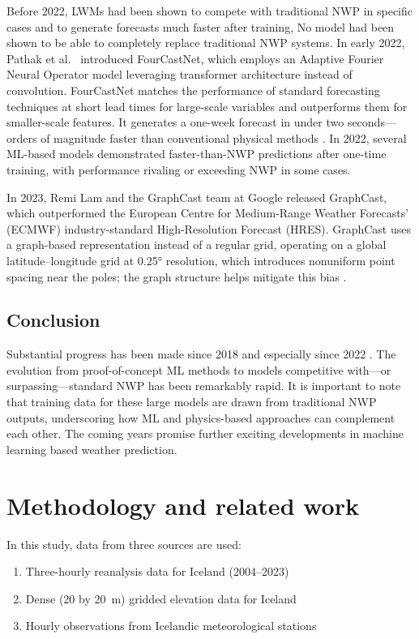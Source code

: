 Before 2022, LWMs had been shown to compete with traditional NWP in specific cases and to generate forecasts much faster after training, No model had been shown to be able to completely replace traditional NWP systems. In early 2022, Pathak et al.\ \cite{FourCastNet} introduced FourCastNet, which employs an Adaptive Fourier Neural Operator model leveraging transformer architecture instead of convolution. FourCastNet matches the performance of standard forecasting techniques at short lead times for large-scale variables and outperforms them for smaller-scale features. It generates a one-week forecast in under two seconds—orders of magnitude faster than conventional physical methods \cite{FourCastNet}. In 2022, several ML-based models demonstrated faster-than-NWP predictions after one-time training, with performance rivaling or exceeding NWP in some cases.

In 2023, Remi Lam and the GraphCast team at Google released GraphCast, which outperformed the European Centre for Medium-Range Weather Forecasts’ (ECMWF) industry-standard High-Resolution Forecast (HRES). GraphCast uses a graph-based representation instead of a regular grid, operating on a global latitude–longitude grid at 0.25° resolution, which introduces nonuniform point spacing near the poles; the graph structure helps mitigate this bias \cite{GraphCast}.

\subsection{Conclusion}
Substantial progress has been made since 2018 and especially since 2022 \cite{SecondRevolution}. The evolution from proof-of-concept ML methods to models competitive with—or surpassing—standard NWP has been remarkably rapid. It is important to note that training data for these large models are drawn from traditional NWP outputs, underscoring how ML and physics-based approaches can complement each other. The coming years promise further exciting developments in machine learning based weather prediction.

\section{Methodology and related work}
In this study, data from three sources are used:

\begin{enumerate}[label=\textbf{\arabic*}.,rightmargin=1.5em]
  \item Three-hourly reanalysis data for Iceland (2004–2023)
  \item Dense (20 by 20~m) gridded elevation data for Iceland
  \item Hourly observations from Icelandic meteorological stations
\end{enumerate}

